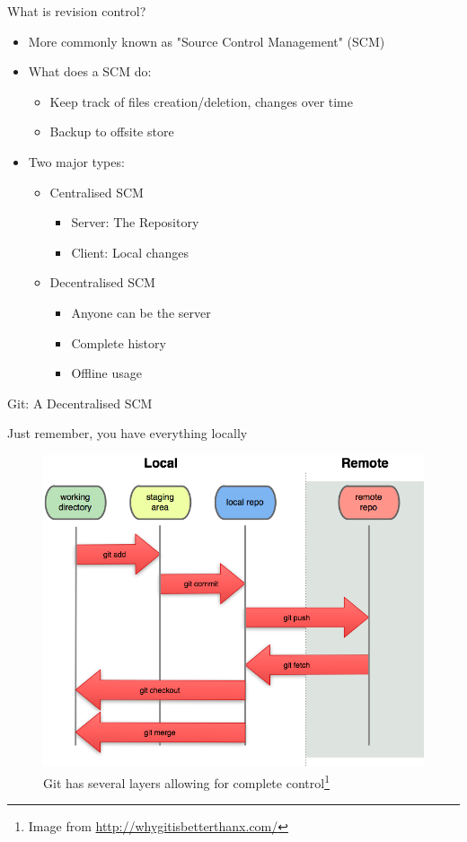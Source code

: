 \begin{frame}{What is revision control?}
    \begin{itemize}
        \item More commonly known as "Source Control Management" (SCM)
        \item What does a SCM do:
        \begin{itemize}
            \item Keep track of files creation/deletion, changes over time
            \item Backup to offsite store
        \end{itemize}  
        \item Two major types:
        \begin{itemize}
            \item Centralised SCM
            \begin{itemize}
                \item Server: The Repository
                \item Client: Local changes
            \end{itemize}
            \item Decentralised SCM
            \begin{itemize}
                \item Anyone can be the server %
                \item Complete history
                \item Offline usage
            \end{itemize}
        \end{itemize}  
    \end{itemize}  
\end{frame}

\begin{frame}{Git: A Decentralised SCM}
    \begin{block}{Just remember, you have everything locally}
    \begin{figure}[ht]
        \centering
        \includegraphics[width=0.6\linewidth]{img/overview.png}
        \caption{Git has several layers allowing for complete control\footnote{Image from \href{http://whygitisbetterthanx.com/}{http://whygitisbetterthanx.com/}}}
        \label{fig:figure0}
    \end{figure}
    \end{block}
\end{frame}

